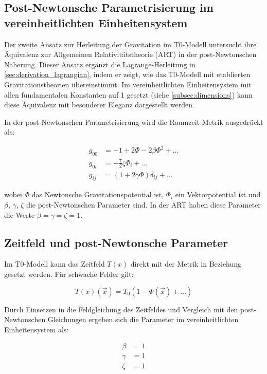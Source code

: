 \documentclass[12pt,a4paper]{article}
\newcommand{\Tfield}{T(x)}
\newcommand{\Tzero}{T_0}
\newcommand{\vecx}{\vec{x}}
\begin{document}
	\subsection{Post-Newtonsche Parametrisierung im vereinheitlichten Einheitensystem}
	\label{subsec:post_newtonian}
	Der zweite Ansatz zur Herleitung der Gravitation im T0-Modell untersucht ihre Äquivalenz zur Allgemeinen Relativitätstheorie (ART) in der post-Newtonschen Näherung. Dieser Ansatz ergänzt die Lagrange-Herleitung in \cref{sec:derivation_lagrangian}, indem er zeigt, wie das T0-Modell mit etablierten Gravitationstheorien übereinstimmt. Im vereinheitlichten Einheitensystem mit allen fundamentalen Konstanten auf 1 gesetzt (siehe \cref{subsec:dimensions}) kann diese Äquivalenz mit besonderer Eleganz dargestellt werden.
	
	In der post-Newtonschen Parametrisierung wird die Raumzeit-Metrik ausgedrückt als:
	
	\begin{align}
		g_{00} &= -1 + 2\Phi - 2\beta\Phi^2 + \dots \\
		g_{0i} &= -\frac{7}{2}\zeta \Phi_i + \dots \\
		g_{ij} &= (1 + 2\gamma\Phi)\delta_{ij} + \dots
	\end{align}
	
	wobei \(\Phi\) das Newtonsche Gravitationspotential ist, \(\Phi_i\) ein Vektorpotential ist und \(\beta\), \(\gamma\), \(\zeta\) die post-Newtonschen Parameter sind. In der ART haben diese Parameter die Werte \(\beta = \gamma = \zeta = 1\).
	
	\subsection{Zeitfeld und post-Newtonsche Parameter}
	Im T0-Modell kann das Zeitfeld \(\Tfield\) direkt mit der Metrik in Beziehung gesetzt werden. Für schwache Felder gilt:
	
	\begin{equation}
		\Tfield(\vecx) = \Tzero(1 - \Phi(\vecx) + \dots)
	\end{equation}
	
	Durch Einsetzen in die Feldgleichung des Zeitfeldes und Vergleich mit den post-Newtonschen Gleichungen ergeben sich die Parameter im vereinheitlichten Einheitensystem als:
	
	\begin{align}
		\beta &= 1 \\
		\gamma &= 1 \\
		\zeta &= 1
	\end{align}
	
\end{document}
